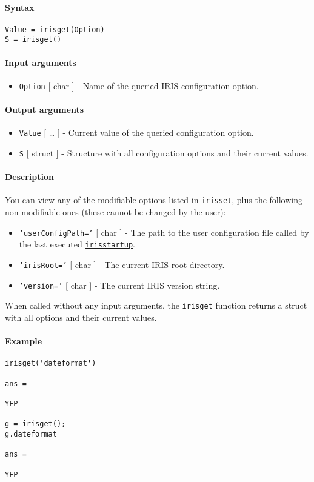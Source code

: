 


	\paragraph{Syntax}

\begin{verbatim}
Value = irisget(Option)
S = irisget()
\end{verbatim}

\paragraph{Input arguments}

\begin{itemize}
\itemsep1pt\parskip0pt
\item
  \texttt{Option} {[} char {]} - Name of the queried IRIS configuration
  option.
\end{itemize}

\paragraph{Output arguments}

\begin{itemize}
\item
  \texttt{Value} {[} \ldots{} {]} - Current value of the queried
  configuration option.
\item
  \texttt{S} {[} struct {]} - Structure with all configuration options
  and their current values.
\end{itemize}

\paragraph{Description}

You can view any of the modifiable options listed in
\href{config/irisset}{\texttt{irisset}}, plus the following
non-modifiable ones (these cannot be changed by the user):

\begin{itemize}
\item
  \texttt{'userConfigPath='} {[} char {]} - The path to the user
  configuration file called by the last executed
  \href{config/irisstartup}{\texttt{irisstartup}}.
\item
  \texttt{'irisRoot='} {[} char {]} - The current IRIS root directory.
\item
  \texttt{'version='} {[} char {]} - The current IRIS version string.
\end{itemize}

When called without any input arguments, the \texttt{irisget} function
returns a struct with all options and their current values.

\paragraph{Example}

\begin{verbatim}
irisget('dateformat')

ans =

YFP

g = irisget();
g.dateformat

ans =

YFP
\end{verbatim}


